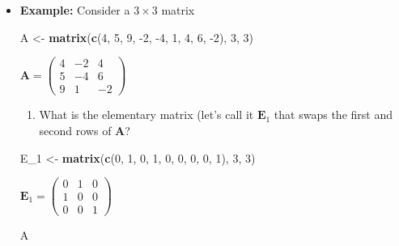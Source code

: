 \documentclass[
]{book}
\newenvironment{Shaded}{\begin{snugshade}}{\end{snugshade}}
\newcommand{\DecValTok}[1]{\textcolor[rgb]{0.00,0.00,0.81}{#1}}
\newcommand{\KeywordTok}[1]{\textcolor[rgb]{0.13,0.29,0.53}{\textbf{#1}}}
\newcommand{\NormalTok}[1]{#1}
\newcommand{\StringTok}[1]{\textcolor[rgb]{0.31,0.60,0.02}{#1}}
\providecommand{\tightlist}{%
  \setlength{\itemsep}{0pt}\setlength{\parskip}{0pt}}
\theoremstyle{definition}
\theoremstyle{definition}
\theoremstyle{definition}
\theoremstyle{definition}
\theoremstyle{remark}
\begin{document}
\begin{itemize}
\item
  \textbf{Example:} Consider a \(3 \times 3\) matrix

\begin{Shaded}
\begin{Highlighting}[]
\NormalTok{A <-}\StringTok{ }\KeywordTok{matrix}\NormalTok{(}\KeywordTok{c}\NormalTok{(}\DecValTok{4}\NormalTok{, }\DecValTok{5}\NormalTok{, }\DecValTok{9}\NormalTok{, }\DecValTok{-2}\NormalTok{, }\DecValTok{-4}\NormalTok{, }\DecValTok{1}\NormalTok{, }\DecValTok{4}\NormalTok{, }\DecValTok{6}\NormalTok{, }\DecValTok{-2}\NormalTok{), }\DecValTok{3}\NormalTok{, }\DecValTok{3}\NormalTok{)}
\end{Highlighting}
\end{Shaded}

  \(\mathbf{A} = \begin{pmatrix} 4 & -2 & 4 \\ 5 & -4 & 6 \\ 9 & 1 & -2 \end{pmatrix}\)

  \begin{enumerate}
  \def\labelenumi{\arabic{enumi})}
  \tightlist
  \item
    What is the elementary matrix (let's call it \(\mathbf{E}_1\) that swaps the first and second rows of \(\mathbf{A}\)?
  \end{enumerate}

\begin{Shaded}
\begin{Highlighting}[]
\NormalTok{E_}\DecValTok{1}\NormalTok{ <-}\StringTok{ }\KeywordTok{matrix}\NormalTok{(}\KeywordTok{c}\NormalTok{(}\DecValTok{0}\NormalTok{, }\DecValTok{1}\NormalTok{, }\DecValTok{0}\NormalTok{, }\DecValTok{1}\NormalTok{, }\DecValTok{0}\NormalTok{, }\DecValTok{0}\NormalTok{,  }\DecValTok{0}\NormalTok{, }\DecValTok{0}\NormalTok{, }\DecValTok{1}\NormalTok{), }\DecValTok{3}\NormalTok{, }\DecValTok{3}\NormalTok{)}
\end{Highlighting}
\end{Shaded}

  \(\mathbf{E}_1 = \begin{pmatrix} 0 & 1 & 0 \\ 1 & 0 & 0 \\ 0 & 0 & 1 \end{pmatrix}\)

\begin{Shaded}
\begin{Highlighting}[]
\NormalTok{A}
\end{Highlighting}
\end{Shaded}


\end{itemize}
\end{document}
